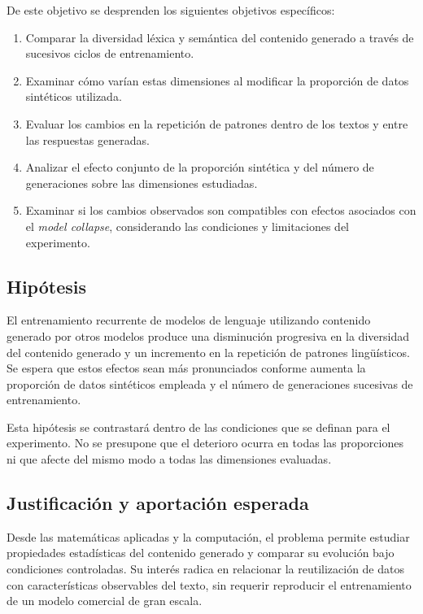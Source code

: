 \documentclass[12pt,letterpaper]{article}
\begin{document}
De este objetivo se desprenden los siguientes objetivos específicos:
\begin{enumerate}
    \item Comparar la diversidad léxica y semántica del contenido generado
    a través de sucesivos ciclos de entrenamiento.
    \item Examinar cómo varían estas dimensiones al modificar la proporción
    de datos sintéticos utilizada.
    \item Evaluar los cambios en la repetición de patrones dentro de los
    textos y entre las respuestas generadas.
    \item Analizar el efecto conjunto de la proporción sintética y del
    número de generaciones sobre las dimensiones estudiadas.
    \item Examinar si los cambios observados son compatibles con efectos
    asociados con el \textit{model collapse}, considerando las condiciones
    y limitaciones del experimento.
\end{enumerate}

\subsection{Hipótesis}
El entrenamiento recurrente de modelos de lenguaje utilizando contenido generado por otros modelos produce una disminución progresiva en la diversidad del contenido generado y un incremento en la repetición de patrones lingüísticos. Se espera que estos efectos sean más pronunciados conforme aumenta la proporción de datos sintéticos empleada y el número de generaciones sucesivas de entrenamiento.

Esta hipótesis se contrastará dentro de las condiciones que se definan para
el experimento. No se presupone que el deterioro ocurra en todas las
proporciones ni que afecte del mismo modo a todas las dimensiones evaluadas.

\subsection{Justificación y aportación esperada}

Desde las matemáticas aplicadas y la computación, el problema permite
estudiar propiedades estadísticas del contenido generado y comparar su
evolución bajo condiciones controladas. Su interés radica en relacionar
la reutilización de datos con características observables del texto, sin
requerir reproducir el entrenamiento de un modelo comercial de gran escala.
\end{document}
